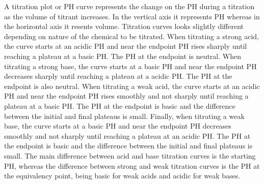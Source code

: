\documentclass[main.tex]{subfiles}
\newcommand\chapterlabel{acids}
\begin{document}
\begin{description}
\newpage
\item[\docfilehook{\smallpencil Titration curves}{Titration curves}] A titration plot or PH curve represents the change on the PH during a titration as the volume of titrant increases. In the vertical axis it represents PH whereas in the horizontal axis it resents volume. Titration curves looks slightly different depending on nature of the chemical to be titrated. When titrating a strong acid, the curve starts at an acidic PH and near the endpoint PH rises sharply until reaching a plateau at a basic PH. The PH at the endpoint is neutral. When titrating a strong base, the curve starts at a basic PH and near the endpoint PH decreases sharply until reaching a plateau at a acidic PH. The PH at the endpoint is also neutral. 
When titrating a weak acid, the curve starts at an acidic PH and near the endpoint PH rises smoothly and not sharply until reaching a plateau at a basic PH. The PH at the endpoint is basic and the difference between the initial and final plateaus is small. Finally, when titrating a weak base, the curve starts at a basic PH and near the endpoint PH  decreases smoothly and not sharply until reaching a plateau at an acidic PH. The PH at the endpoint is basic and the difference between the initial and final plateaus is small. The main difference between acid and base titration curves is the starting PH, whereas the difference between strong and weak titration curves is the PH at the equivalency point, being basic for weak acids and acidic for weak bases.

\vspace{4cm}
     \label{Fig:{\chapterlabel}\thefigurenewcounter}
\hspace{-8cm}\vspace{10cm}
\begin{minipage}[b]{1.\linewidth}
\begin{center}
\end{center}
\end{minipage}
\end{description}
\end{document}
